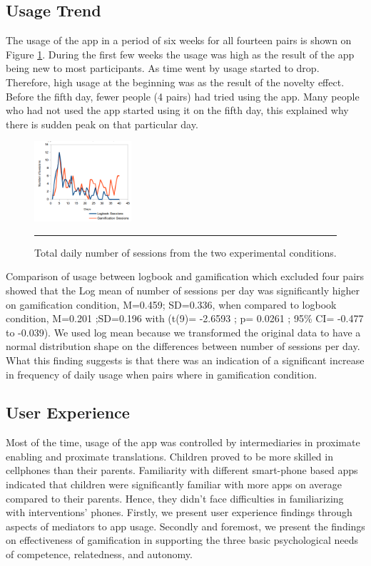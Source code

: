 \documentclass{sig-alternate}
\begin{document}
\subsection{Usage Trend} 
The usage of the app in a period of six weeks for all fourteen pairs is shown on Figure \ref{figure:usagedailysessions}. During the first few weeks the usage was high as the result of the app being new to most participants. As time went by usage started to drop. Therefore, high usage at the beginning was as the result of the novelty effect.  Before the fifth day, fewer people (4 pairs) had tried using the app. Many people who had not used the app started using it on the fifth day, this explained why there is sudden peak on that particular day.
\begin{figure}[htbp]
  \centering
    \includegraphics[width=0.32\textwidth]{scatter_daily_sessions.png}
    \rule{26em}{0.5pt}
  \caption{Total daily number of sessions from the two experimental conditions.}
  \label{figure:usagedailysessions}
\end{figure} 
Comparison of usage between logbook and gamification which excluded four pairs showed that the Log mean of number of sessions per day was significantly higher on gamification condition, M=0.459; SD=0.336, when compared to logbook condition, M=0.201 ;SD=0.196 with (t(9)= -2.6593 ; p= 0.0261 ; 95\% CI=  -0.477 to -0.039). We used log mean because we transformed the original data to have a normal distribution shape on the differences between number of sessions per day. What this finding suggests is that there was an indication of a significant increase in frequency of daily usage when pairs where in gamification condition.
\subsection{User Experience}
Most of the time, usage of the app was controlled by intermediaries in proximate enabling and proximate translations\cite{sambasivan2010}. Children proved to be more skilled in cellphones than their parents. Familiarity with different smart-phone based apps indicated that children were significantly familiar with more apps on average compared to their parents. Hence, they didn't face difficulties in familiarizing with interventions' phones. Firstly, we present user experience findings through aspects of  mediators to app usage. Secondly and foremost, we present the findings on effectiveness of gamification in supporting the three basic psychological needs of competence, relatedness, and autonomy.
\end{document}
